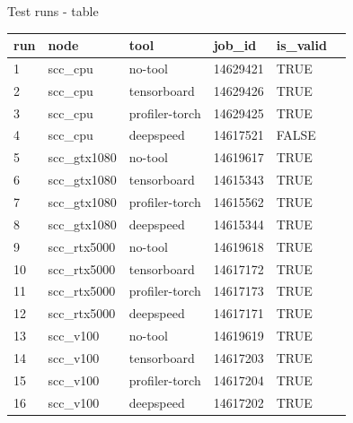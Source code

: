 \documentclass[compress,aspectratio=169]{beamer}
\begin{document}
\begin{frame}{Test runs - table}
\scriptsize{
\begin{table}[]
\begin{tabular}{@{}llllll@{}}
\toprule
run & node         & tool           & job\_id  & is\_valid \\ \midrule
1   & scc\_cpu     & no-tool        & 14629421 & TRUE      \\
2   & scc\_cpu     & tensorboard    & 14629426 & TRUE      \\
3   & scc\_cpu     & profiler-torch & 14629425 & TRUE      \\
4   & scc\_cpu     & deepspeed      & 14617521 & FALSE     \\
5   & scc\_gtx1080 & no-tool        & 14619617 & TRUE      \\
6   & scc\_gtx1080 & tensorboard    & 14615343 & TRUE      \\
7   & scc\_gtx1080 & profiler-torch & 14615562 & TRUE      \\
8   & scc\_gtx1080 & deepspeed      & 14615344 & TRUE      \\
9   & scc\_rtx5000 & no-tool        & 14619618 & TRUE      \\
10  & scc\_rtx5000 & tensorboard    & 14617172 & TRUE      \\
11  & scc\_rtx5000 & profiler-torch & 14617173 & TRUE      \\
12  & scc\_rtx5000 & deepspeed      & 14617171 & TRUE      \\
13  & scc\_v100    & no-tool        & 14619619 & TRUE      \\
14  & scc\_v100    & tensorboard    & 14617203 & TRUE      \\
15  & scc\_v100    & profiler-torch & 14617204 & TRUE      \\
16  & scc\_v100    & deepspeed      & 14617202 & TRUE      \\ \bottomrule
\end{tabular}
\end{table}
}
\end{frame}
\end{document}
